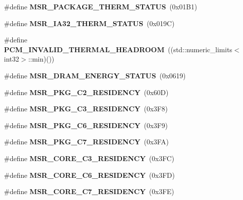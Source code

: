 \begin{DoxyCompactItemize}
\item 
\#define {\bfseries M\+S\+R\+\_\+\+P\+A\+C\+K\+A\+G\+E\+\_\+\+T\+H\+E\+R\+M\+\_\+\+S\+T\+A\+T\+U\+S}~(0x01\+B1)\label{types_8h_a4d40c003f2608f118c644465406aed3b}

\item 
\#define {\bfseries M\+S\+R\+\_\+\+I\+A32\+\_\+\+T\+H\+E\+R\+M\+\_\+\+S\+T\+A\+T\+U\+S}~(0x019\+C)\label{types_8h_a3940bd7e7cc81fd9476152b71e29ea7b}

\item 
\#define {\bfseries P\+C\+M\+\_\+\+I\+N\+V\+A\+L\+I\+D\+\_\+\+T\+H\+E\+R\+M\+A\+L\+\_\+\+H\+E\+A\+D\+R\+O\+O\+M}~((std\+::numeric\+\_\+limits$<$int32$>$\+::min)())\label{types_8h_a2f51296747d63852b05ea0afab0b700e}

\item 
\#define {\bfseries M\+S\+R\+\_\+\+D\+R\+A\+M\+\_\+\+E\+N\+E\+R\+G\+Y\+\_\+\+S\+T\+A\+T\+U\+S}~(0x0619)\label{types_8h_a26933b2c6904d22e9964f3f12c730fc8}

\item 
\#define {\bfseries M\+S\+R\+\_\+\+P\+K\+G\+\_\+\+C2\+\_\+\+R\+E\+S\+I\+D\+E\+N\+C\+Y}~(0x60\+D)\label{types_8h_a82b97c2b35585f2293a7aa66839f472a}

\item 
\#define {\bfseries M\+S\+R\+\_\+\+P\+K\+G\+\_\+\+C3\+\_\+\+R\+E\+S\+I\+D\+E\+N\+C\+Y}~(0x3\+F8)\label{types_8h_a6c046e593954087b70981b8169b470f9}

\item 
\#define {\bfseries M\+S\+R\+\_\+\+P\+K\+G\+\_\+\+C6\+\_\+\+R\+E\+S\+I\+D\+E\+N\+C\+Y}~(0x3\+F9)\label{types_8h_a7b1860de9867ad4e3c29bd2e240686b4}

\item 
\#define {\bfseries M\+S\+R\+\_\+\+P\+K\+G\+\_\+\+C7\+\_\+\+R\+E\+S\+I\+D\+E\+N\+C\+Y}~(0x3\+F\+A)\label{types_8h_ae5f3968ee1644c8e11ed55463378b5a1}

\item 
\#define {\bfseries M\+S\+R\+\_\+\+C\+O\+R\+E\+\_\+\+C3\+\_\+\+R\+E\+S\+I\+D\+E\+N\+C\+Y}~(0x3\+F\+C)\label{types_8h_a0ebfd4e08ba05ea086c2b62a65962800}

\item 
\#define {\bfseries M\+S\+R\+\_\+\+C\+O\+R\+E\+\_\+\+C6\+\_\+\+R\+E\+S\+I\+D\+E\+N\+C\+Y}~(0x3\+F\+D)\label{types_8h_a469d53b8d39927c4789bdb2ed12dcd8c}

\item 
\#define {\bfseries M\+S\+R\+\_\+\+C\+O\+R\+E\+\_\+\+C7\+\_\+\+R\+E\+S\+I\+D\+E\+N\+C\+Y}~(0x3\+F\+E)\label{types_8h_aa809d05086aa9345a20960e502e4935d}

\end{DoxyCompactItemize}
